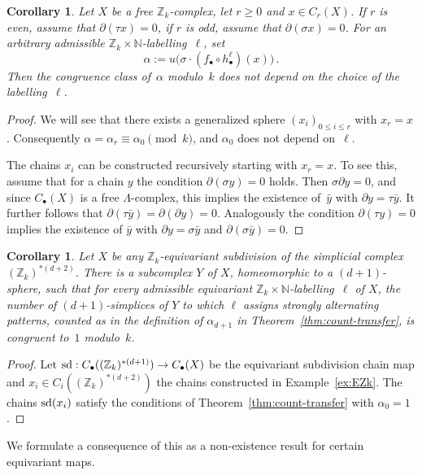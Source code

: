 \documentclass[11pt,a4paper,draft]{article}
\newcommand{\Z}{{\mathbb Z}}
\newcommand{\N}{{\mathbb N}}
\newcommand{\dd}{\partial}
\newtheorem{corollary}[theorem]{Corollary}
\theoremstyle{definition}
\begin{document}
\begin{corollary}\label{cor:alpha-independent}
Let $X$ be a free $\Z_k$-complex, let $r\ge0$  and $x\in C_r(X)$.
If $r$ is even, assume that $\dd (\tau x)=0$,  if $r$ is odd,
assume that $\dd (\sigma x)=0$.
For an arbitrary admissible $\Z_k\times\N$-labelling~$\ell$, set
\[
 \alpha := u \big( \sigma\cdot (  f_\bullet \circ h_\bullet^{\ell}) (x) \big)  \, .
\]
Then the congruence class of~$\alpha$ modulo~$k$ does not depend on
the choice of the labelling~$\ell$.
\end{corollary}

\begin{proof}
We will see that there exists a generalized sphere $(x_i)_{0 \leq i \leq r}$ 
 with $x_r=x$.  Consequently
$\alpha=\alpha_r\equiv\alpha_0\pmod k$, and $\alpha_0$ does not depend
on~$\ell$.

The chains $x_i$ can be constructed recursively starting with $x_r=x$.
To see this, assume that for a chain $y$ the condition $\dd(\sigma
y)=0$ holds.  Then $\sigma \dd y=0$, and since $C_\bullet(X)$ is a free
$\Lambda$-complex, this implies the existence of~$\bar y$ with $\dd
y=\tau\bar y$.  It further follows that $\dd(\tau\bar y)=\dd(\dd
y)=0$.  Analogously the condition $\dd(\tau y)=0$ implies the existence of
$\bar y$ with $\dd y=\sigma\bar y$ and $\dd(\sigma\bar y)=0$.
\end{proof}




\begin{corollary}\label{cor:ZkTucker0}
  Let $X$ be any $\Z_k$-equivariant
  subdivision of the simplicial complex~$(\Z_k)^{*(d+2)}$.
  There is a subcomplex $Y$ of $X$, homeomorphic to a $(d+1)$-sphere,
  such that for every admissible equivariant $\Z_k\times\N$-labelling~$\ell$
  of $X$, the number of $(d+1)$-simplices of $Y$ to which $\ell$ assigns
  strongly alternating patterns, counted as in the definition of
  $\alpha_{d+1}$ in Theorem~\ref{thm:count-transfer}, is congruent to~$1$ modulo~$k$.
\end{corollary}

\begin{proof}
Let $\mathop{\rm sd}:C_\bullet((\Z_k)^{*(d+1)})\to C_\bullet(X)$ be the
equivariant subdivision chain map and $x_i\in C_i((\Z_k)^{*(d+2)})$
the chains constructed in Example~\ref{ex:EZk}.  The chains
$\mathop{\rm sd}(x_i)$ satisfy the conditions of
Theorem~\ref{thm:count-transfer} with $\alpha_0=1$.
\end{proof}

We formulate a consequence of this as a non-existence result
for certain equivariant maps.
\end{document}
